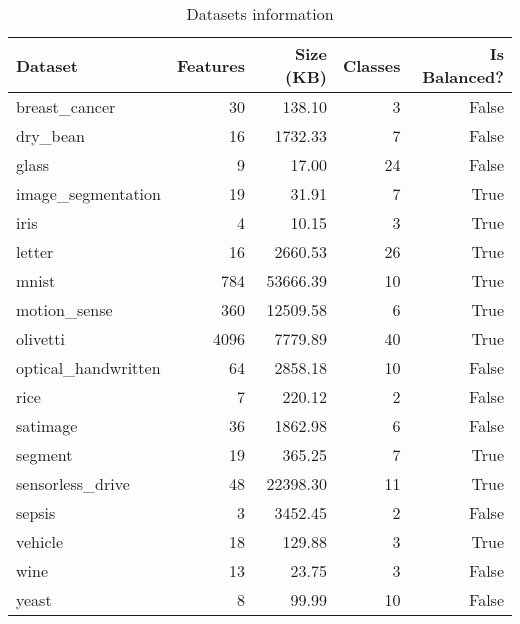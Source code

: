 \begin{table}
\caption{Datasets information}
\label{tab:datasets_info}
\begin{tabular}{lrrrr}
\toprule
Dataset & Features & Size (KB) & Classes & Is Balanced? \\
\midrule
breast\_cancer & 30 & 138.10 & 3 & False \\
dry\_bean & 16 & 1732.33 & 7 & False \\
glass & 9 & 17.00 & 24 & False \\
image\_segmentation & 19 & 31.91 & 7 & True \\
iris & 4 & 10.15 & 3 & True \\
letter & 16 & 2660.53 & 26 & True \\
mnist & 784 & 53666.39 & 10 & True \\
motion\_sense & 360 & 12509.58 & 6 & True \\
olivetti & 4096 & 7779.89 & 40 & True \\
optical\_handwritten & 64 & 2858.18 & 10 & False \\
rice & 7 & 220.12 & 2 & False \\
satimage & 36 & 1862.98 & 6 & False \\
segment & 19 & 365.25 & 7 & True \\
sensorless\_drive & 48 & 22398.30 & 11 & True \\
sepsis & 3 & 3452.45 & 2 & False \\
vehicle & 18 & 129.88 & 3 & True \\
wine & 13 & 23.75 & 3 & False \\
yeast & 8 & 99.99 & 10 & False \\
\bottomrule
\end{tabular}
\end{table}
